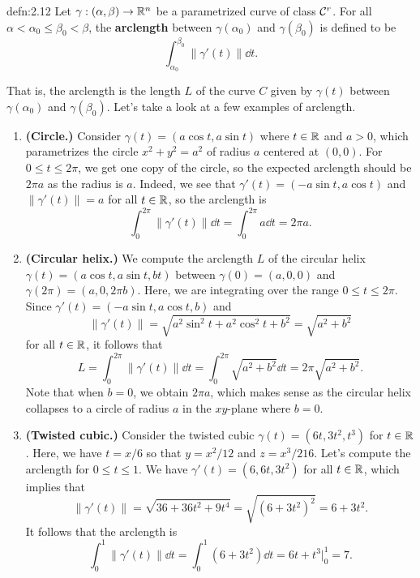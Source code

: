 \begin{defn}{defn:2.12}
    Let $\gamma : (\alpha, \beta) \to \mathbb{R}^n$ be a parametrized curve of class 
    ${\cal C}^r$. For all $\alpha < \alpha_0 \leq \beta_0 < \beta$, the 
    {\bf arclength} between $\gamma(\alpha_0)$ and $\gamma(\beta_0)$ is 
    defined to be 
    \[ \int_{\alpha_0}^{\beta_0} \|\gamma'(t)\|\dd t. \] 
\end{defn}\vspace{-0.25cm}
That is, the arclength is the length $L$ of the curve $C$ given by $\gamma(t)$ 
between $\gamma(\alpha_0)$ and $\gamma(\beta_0)$.
Let's take a look at a few examples of arclength. 

\begin{enumerate}[(1)]
    \item {\bf (Circle.)} Consider $\gamma(t) = (a\cos t, a\sin t)$ where 
    $t \in \mathbb{R}$ and $a > 0$, which parametrizes the circle $x^2 + y^2 = a^2$ 
    of radius $a$ centered at $(0, 0)$. For $0 \leq t \leq 2\pi$, 
    we get one copy of the circle, so the expected arclength 
    should be $2\pi a$ as the radius is $a$. Indeed, we see that $\gamma'(t) 
    = (-a\sin t, a\cos t)$ and $\|\gamma'(t)\| = a$ for all $t \in \mathbb{R}$, so the arclength is 
    \[ \int_0^{2\pi} \|\gamma'(t)\|\dd t = \int_0^{2\pi} a\dd t = 2\pi a. \] 

    \item {\bf (Circular helix.)} We compute the arclength $L$ of the 
    circular helix $\gamma(t) = (a\cos t, a\sin t, bt)$ between 
    $\gamma(0) = (a, 0, 0)$ and $\gamma(2\pi) = (a, 0, 2\pi b)$.
    Here, we are integrating over the range $0 \leq t \leq 2\pi$. 
    Since $\gamma'(t) = (-a\sin t, a\cos t, b)$ and 
    \[ \|\gamma'(t)\| = \sqrt{a^2\sin^2 t + a^2\cos^2 t + b^2} = \sqrt{a^2+b^2} \] 
    for all $t \in \mathbb{R}$, it follows that 
    \[ L = \int_0^{2\pi} \|\gamma'(t)\|\dd t 
    = \int_0^{2\pi} \sqrt{a^2+b^2}\dd t = 2\pi\sqrt{a^2+b^2}. \] 
    Note that when $b = 0$, we obtain $2\pi a$, which makes sense as 
    the circular helix collapses to a circle of radius $a$ in the $xy$-plane
    where $b = 0$.

    \item {\bf (Twisted cubic.)} Consider the twisted cubic 
    $\gamma(t) = (6t, 3t^2, t^3)$ for $t \in \mathbb{R}$. Here, we have 
    $t = x/6$ so that $y = x^2/12$ and $z = x^3/216$. Let's compute 
    the arclength for $0 \leq t \leq 1$. We have $\gamma'(t) = (6, 6t, 3t^2)$
    for all $t \in \mathbb{R}$, which implies that 
    \[ \|\gamma'(t)\| = \sqrt{36+36t^2+9t^4} = \sqrt{(6+3t^2)^2} = 6 + 3t^2. \] 
    It follows that the arclength is 
    \[ \int_0^1 \|\gamma'(t)\|\dd t = \int_0^1 (6 + 3t^2)\dd t 
    = 6t + t^3 \Big|_0^1 = 7. \] 
\end{enumerate}

